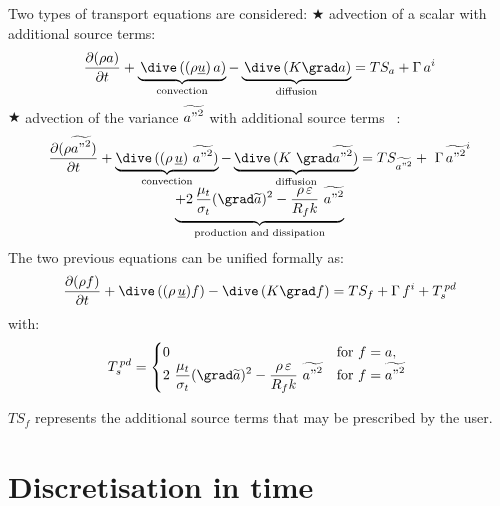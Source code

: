 Two types of transport equations are considered: \newline
{\tiny $\bigstar $} advection of a scalar with additional source terms:
\begin{equation}
\frac{\partial (\rho a)}{\partial t}+\underbrace{\,\dive\,((\rho \underline{u%
})\,a)}_{\text{convection}}-\underbrace{\,\dive\,(K\grad a)}_{\text{diffusion%
}}=TS_{a}+\Gamma \,a^{i}
\end{equation}%
{\tiny $\bigstar $} advection of the variance $\widetilde{{a"}^{2}}$ with
additional source terms ~:
\begin{equation}
\begin{array}{lcl}
& \displaystyle\frac{\partial (\rho \widetilde{{a"}^{2}})}{\partial t}+%
\underbrace{\dive\,((\rho \,\underline{u})\ \widetilde{{a"}^{2}})}_{\text{%
convection}}-\underbrace{\dive\,(K\ \grad\widetilde{{a"}^{2}})}_{\text{%
diffusion}}=TS_{\widetilde{{a"}^{2}}}+\ \Gamma \,\widetilde{{a"}^{2}}^{i} &
\\
& \displaystyle\underbrace{+2\,\frac{\mu _{t}}{\sigma _{t}}(\grad\widetilde{a%
})^{2}-\frac{\rho \,\varepsilon }{R_{f}k}\ \widetilde{{a"}^{2}}}_{\text{%
production and dissipation}} &
\end{array}%
\end{equation}%
The two previous equations can be unified formally as:
\begin{equation}
\frac{\partial (\rho f)}{\partial t}+\dive\,((\rho \,\underline{u})f)-\dive%
\,(K\grad f)=TS_{f}+\Gamma \,f^{i}+T_{s}^{\,pd}  \label{Base_Introd_depart}
\end{equation}%
with:
\begin{equation}
\begin{array}{lll}
& \displaystyle T_{s}^{\,pd}=\begin{cases} 0 & \text{for $f=a$}, \\ 2\
\displaystyle \frac{\mu_t}{\sigma_t}(\grad \widetilde{a})^2 - \displaystyle
\frac{\rho\,\varepsilon}{R_f k}\ \widetilde{{a"}^2} & \text{for
$f=\widetilde{{a"}^2}$ } \end{cases} &
\end{array}%
\end{equation}

$TS_f$ represents the additional source terms that may be prescribed by the
user.

\newpage %

\section*{Discretisation in time}

